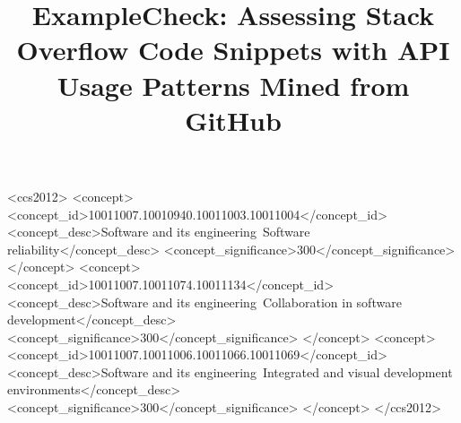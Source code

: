 \documentclass[sigconf, review, anonymous]{acmart}
\begin{document}
\title{{\sc ExampleCheck}: Assessing Stack Overflow Code Snippets with API Usage Patterns Mined from GitHub}




\begin{CCSXML}
<ccs2012>
<concept>
<concept_id>10011007.10010940.10011003.10011004</concept_id>
<concept_desc>Software and its engineering~Software reliability</concept_desc>
<concept_significance>300</concept_significance>
</concept>
<concept>
<concept_id>10011007.10011074.10011134</concept_id>
<concept_desc>Software and its engineering~Collaboration in software development</concept_desc>
<concept_significance>300</concept_significance>
</concept>
<concept>
<concept_id>10011007.10011006.10011066.10011069</concept_id>
<concept_desc>Software and its engineering~Integrated and visual development environments</concept_desc>
<concept_significance>300</concept_significance>
</concept>
</ccs2012>
\end{CCSXML}



\maketitle




\end{document}
